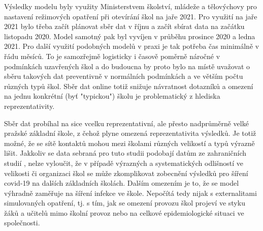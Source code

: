 Výsledky modelu byly využity Ministerstvem školství, mládeže a tělovýchovy pro nastavení režimových opatření při otevírání škol na jaře 2021. Pro využití na jaře 2021 bylo třeba začít plánovat sběr dat v říjnu a začít sbírat data na začátku listopadu 2020. Model samotný pak byl vyvíjen v průběhu prosince 2020 a ledna 2021. Pro další využití podobných modelů v praxi je tak potřeba čas minimálně v řádu měsíců. To je samozřejmě logisticky i časově poměrně náročné v podmínkách uzavřených škol a do budoucna by proto bylo na místě uvažovat o sběru takových dat preventivně v normálních podmínkách a ve větším počtu různých typů škol. Sběr dat online totiž snižuje návratnost dotazníků a omezení na jednu konkrétní  (byť "typickou") školu je problematický z hlediska reprezentativity.

Sběr dat probíhal na sice vcelku reprezentativní, ale přesto nadprůměrně velké pražské základní škole, z čehož plyne omezená reprezentativita výsledků. Je totiž možné, že se sítě kontaktů mohou mezi školami různých velikostí a typů výrazně lišit. Jakkoliv se data sebraná pro tuto studii podobají datům ze zahraničních studií \cite{gemmetto2014mitigation, mcgee2021model, stehle2011high}, nelze vyloučit, že v případě výrazných a systematických odlišností ve velikosti či organizaci škol se může zkomplikovat zobecnění výsledků pro šíření covid-19 na dalších základních školách. Dalším omezením je to, že se model výhradně zaměřuje na šíření infekce ve škole. Nepočítá tedy nijak s externalitami simulovaných opatření, tj. s tím, jak se omezení provozu škol projeví ve styku žáků a učitelů mimo školní provoz nebo na celkové epidemiologické situaci ve společnosti.










